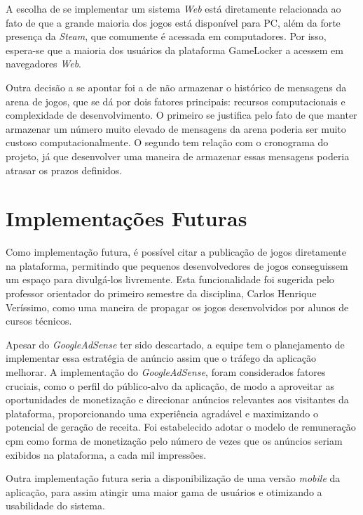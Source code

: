 A escolha de se implementar um sistema \textit{Web} está diretamente relacionada ao fato de que a grande maioria dos jogos está disponível para PC, além da forte presença da \textit{\gls{Steam}}, que comumente é acessada em computadores. Por isso, espera-se que a maioria dos usuários da plataforma GameLocker a acessem em navegadores \textit{Web}.%

Outra decisão a se apontar foi a de não armazenar o histórico de mensagens da arena de jogos, que se dá por dois fatores principais: recursos computacionais e complexidade de desenvolvimento. O primeiro se justifica pelo fato de que manter armazenar um número muito elevado de mensagens da arena poderia ser muito custoso computacionalmente. O segundo tem relação com o cronograma do projeto, já que desenvolver uma maneira de armazenar essas mensagens poderia atrasar os prazos definidos.

\section{Implementações Futuras}

Como implementação futura, é possível citar a publicação de jogos diretamente na plataforma, permitindo que pequenos desenvolvedores de jogos conseguissem um espaço para divulgá-los livremente. Esta funcionalidade foi sugerida pelo professor orientador do primeiro semestre da disciplina, Carlos Henrique Veríssimo, como uma maneira de propagar os jogos desenvolvidos por alunos de cursos técnicos.

Apesar do \textit{\gls{GoogleAdSense}} ter sido descartado, a equipe tem o planejamento de implementar essa estratégia de anúncio assim que o tráfego da aplicação melhorar. A implementação do \textit{\gls{GoogleAdSense}}, foram considerados fatores cruciais, como o perfil do público-alvo da aplicação, de modo a aproveitar as oportunidades de monetização e direcionar anúncios relevantes aos visitantes da plataforma, proporcionando uma experiência agradável e maximizando o potencial de geração de receita. Foi estabelecido adotar o modelo de remuneração \ac{cpm} como forma de monetização pelo número de vezes que os anúncios seriam exibidos na plataforma, a cada mil impressões.

Outra implementação futura seria a disponibilização de uma versão \textit{mobile} da aplicação, para assim atingir uma maior gama de usuários e otimizando a usabilidade do sistema.